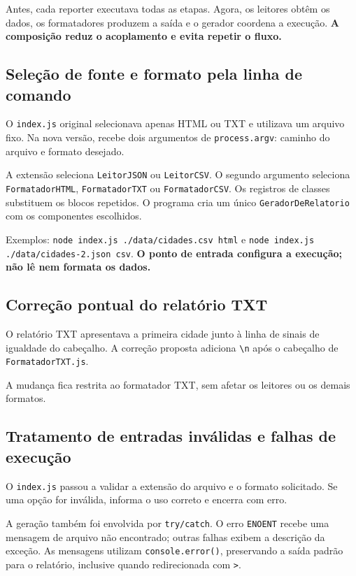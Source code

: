 \documentclass[12pt,a4paper]{article}
\begin{document}
Antes, cada reporter executava todas as etapas. Agora, os leitores obtêm os dados, os formatadores produzem a saída e o gerador coordena a execução. \textbf{A composição reduz o acoplamento e evita repetir o fluxo.}

\subsection{Seleção de fonte e formato pela linha de comando}
O \texttt{index.js} original selecionava apenas HTML ou TXT e utilizava um arquivo fixo. Na nova versão, recebe dois argumentos de \texttt{process.argv}: caminho do arquivo e formato desejado.

A extensão seleciona \texttt{LeitorJSON} ou \texttt{LeitorCSV}. O segundo argumento seleciona \texttt{FormatadorHTML}, \texttt{FormatadorTXT} ou \texttt{FormatadorCSV}. Os registros de classes substituem os blocos repetidos. O programa cria um único \texttt{GeradorDeRelatorio} com os componentes escolhidos.

Exemplos: \texttt{node index.js ./data/cidades.csv html} e \texttt{node index.js ./data/cidades-2.json csv}. \textbf{O ponto de entrada configura a execução; não lê nem formata os dados.}

\subsection{Correção pontual do relatório TXT}
O relatório TXT apresentava a primeira cidade junto à linha de sinais de igualdade do cabeçalho. A correção proposta adiciona \verb|\n| após o cabeçalho de \texttt{FormatadorTXT.js}.

A mudança fica restrita ao formatador TXT, sem afetar os leitores ou os demais formatos.

\subsection{Tratamento de entradas inválidas e falhas de execução}
O \texttt{index.js} passou a validar a extensão do arquivo e o formato solicitado. Se uma opção for inválida, informa o uso correto e encerra com erro.

A geração também foi envolvida por \texttt{try/catch}. O erro \texttt{ENOENT} recebe uma mensagem de arquivo não encontrado; outras falhas exibem a descrição da exceção. As mensagens utilizam \texttt{console.error()}, preservando a saída padrão para o relatório, inclusive quando redirecionada com \texttt{>}.
\end{document}

